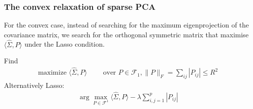 \subsubsection*{The convex relaxation of sparse PCA}
For the convex case, instead of searching for the maximum eigenprojection of the covariance matrix, we search for the orthogonal symmetric matrix that maximise $\langle \hat{\Sigma}, P \rangle$ under the Lasso condition.
\begin{method}
Find
\begin{align*}
	\text{maximize } \langle \hat{\Sigma}, P\rangle\qquad \text{ over }
	P \in \mathcal{F}_1, \|P\|_F= \sum_{ij}|P_{ij}| \le R^2
\end{align*}
Alternatively Lasso:
\begin{align*}
		\arg\max_{P \in \mathcal{F}^1}\langle \hat{\Sigma}, P\rangle - \lambda\sum_{i, j = 1}^p|P_{ij}|
	\end{align*}
\end{method}

